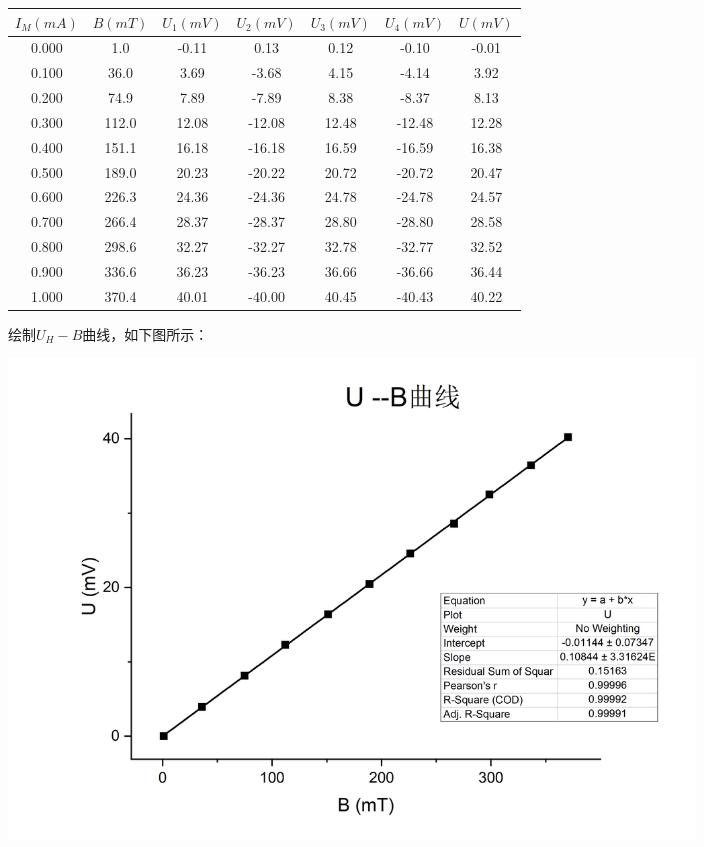 \documentclass{article}
\begin{document}
    \begin{center}
        \begin{tabular}{|c||c||c|c|c|c||c|}
            \hline
            $I_M(mA)$ & $B(mT)$ &$U_1(mV)$ & $U_2(mV)$ & $U_3(mV)$ & $U_4(mV)$ & $U(mV)$ \\
            \hline
            0.000 & 1.0 & -0.11 & 0.13 & 0.12 & -0.10 & -0.01 \\
            \hline
            0.100 & 36.0 & 3.69 & -3.68 & 4.15 & -4.14 & 3.92 \\
            \hline
            0.200 & 74.9 & 7.89 & -7.89 & 8.38 & -8.37 & 8.13 \\
            \hline
            0.300 & 112.0 & 12.08 & -12.08 & 12.48 & -12.48 & 12.28 \\
            \hline
            0.400 & 151.1 & 16.18 & -16.18 & 16.59 & -16.59 & 16.38 \\
            \hline
            0.500 & 189.0 & 20.23 & -20.22 & 20.72 & -20.72 & 20.47 \\
            \hline
            0.600 & 226.3 & 24.36 & -24.36 & 24.78 & -24.78 & 24.57 \\
            \hline
            0.700 & 266.4 & 28.37 & -28.37 & 28.80 & -28.80 & 28.58 \\
            \hline
            0.800 & 298.6 & 32.27 & -32.27 & 32.78 & -32.77 & 32.52 \\
            \hline
            0.900 & 336.6 & 36.23 & -36.23 & 36.66 & -36.66 & 36.44 \\
            \hline
            1.000 & 370.4 & 40.01 & -40.00 & 40.45 & -40.43 & 40.22 \\
            \hline
        \end{tabular}        
    \end{center}

    绘制$U_H-B$曲线，如下图所示：

    \begin{center}
        \includegraphics[width=0.8\textwidth]{U-B curve.jpg}
    \end{center}
\end{document}
